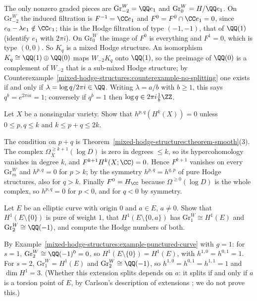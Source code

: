\begin{solution}
The only nonzero graded pieces are $\mathrm{Gr}^W_{-2} = \QQ e_1$ and $\mathrm{Gr}^W_0 = H/\QQ e_1$. On $\mathrm{Gr}^W_{-2}$ the induced filtration is $F^{-1} = \CC e_1$ and $F^0 = F^0 \cap \CC e_1 = 0$, since
$e_0 - \lambda e_1 \notin \CC e_1$; this is the Hodge filtration of type $(-1,-1)$, that of $\QQ(1)$ (identify $e_1$ with $2\pi i$). On $\mathrm{Gr}^W_0$ the image of $F^0$ is everything and $F^1 = 0$, which is
type $(0,0)$. So $K_q$ is a mixed Hodge structure. An isomorphism $K_q \cong \QQ(1) \oplus \QQ(0)$ maps $W_{-2}K_q$ onto $\QQ(1)$, so the preimage of $\QQ(0)$ is a complement of $W_{-2}$ that is a
sub-mixed Hodge structure; by Counterexample~\ref{mixed-hodge-structures:counterexample-no-splitting} one exists if and only if $\lambda = \log q/2\pi i \in \QQ$. Writing $\lambda = a/b$ with $b \geq 1$, this
says $q^b = e^{2\pi ia} = 1$; conversely if $q^b = 1$ then $\log q \in 2\pi i\frac{1}{b}\ZZ$.
\end{solution}

\begin{exercise}\label{mixed-hodge-structures:exercise-hodge-number-bounds}
Let $X$ be a nonsingular variety. Show that $h^{p,q}(H^k(X)) = 0$ unless $0 \leq p, q \leq k$ and $k \leq p + q \leq 2k$.
\end{exercise}

\begin{solution}
The condition on $p + q$ is Theorem~\ref{mixed-hodge-structures:theorem-smooth}(3). The complex $\Omega^{\geq k+1}_{\bar X}(\log D)$ is zero in degrees $\leq k$, so its hypercohomology vanishes in degree $k$, and
$F^{k+1}H^k(X; \CC) = 0$. Hence $F^{k+1}$ vanishes on every $\mathrm{Gr}^W_m$ and $h^{p,q} = 0$ for $p > k$; by the symmetry $h^{p,q} = h^{q,p}$ of pure Hodge structures, also for $q > k$. Finally
$F^0 = H_\CC$ because $\Omega^{\geq 0}(\log D)$ is the whole complex, so $h^{p,q} = 0$ for $p < 0$, and for $q < 0$ by symmetry.
\end{solution}

\begin{exercise}\label{mixed-hodge-structures:exercise-elliptic-punctured}
Let $E$ be an elliptic curve with origin $0$ and $a \in E$, $a \neq 0$. Show that $H^1(E \setminus \{0\})$ is pure of weight $1$, that $H^1(E \setminus \{0, a\})$ has $\mathrm{Gr}^W_1 \cong H^1(E)$ and $\mathrm{Gr}^W_2 \cong \QQ(-1)$, and compute the
Hodge numbers of both.
\end{exercise}

\begin{solution}
By Example~\ref{mixed-hodge-structures:example-punctured-curve} with $g = 1$: for $s = 1$, $\mathrm{Gr}^W_2 \cong \QQ(-1)^0 = 0$, so $H^1(E \setminus \{0\}) = H^1(E)$, with $h^{1,0} = h^{0,1} = 1$. For $s = 2$,
$\mathrm{Gr}^W_1 = H^1(E)$ and $\mathrm{Gr}^W_2 \cong \QQ(-1)$, so $h^{1,0} = h^{0,1} = h^{1,1} = 1$ and $\dim H^1 = 3$. (Whether this extension splits depends on $a$: it splits if and only if $a$ is a torsion
point of $E$, by Carlson's description of extensions \cite{carlson-1980}; we do not prove this.)
\end{solution}
